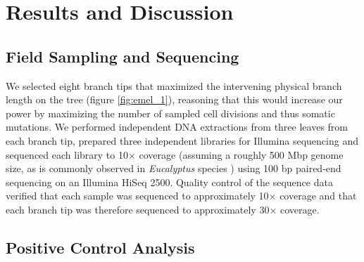 \section{Results and Discussion}

\subsection{Field Sampling and Sequencing}

We selected eight branch tips that maximized the intervening physical branch length on the tree (figure \ref{fig:emel_1}), reasoning that this would increase our power by maximizing the number of sampled cell divisions and thus somatic mutations. We performed independent DNA extractions from three leaves from each branch tip, prepared three independent libraries for Illumina sequencing and sequenced each library to 10× coverage (assuming a roughly 500 Mbp genome size, as is commonly observed in \textit{Eucalyptus} species \parencite{grattapaglia_progress_2012}) using 100 bp paired-end sequencing on an Illumina HiSeq 2500. Quality control of the sequence data verified that each sample was sequenced to approximately 10× coverage and that each branch tip was therefore sequenced to approximately 30× coverage.

\subsection{Positive Control Analysis}

